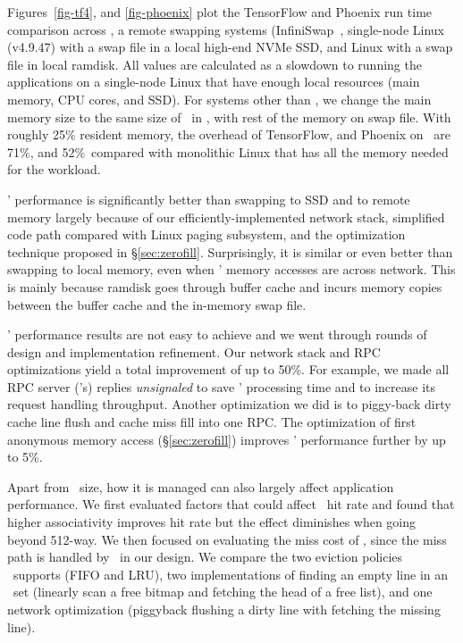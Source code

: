 \documentclass[10pt,times,twocolumn]{z2-article}
\begin{document}
{{{{{{{
Figures~\ref{fig-tf4}, and \ref{fig-phoenix} plot the TensorFlow and Phoenix run time comparison across 
\lego, a remote swapping systems (InfiniSwap~\cite{GU17-NSDI}, 
single-node Linux (v4.9.47) with a swap file in a local high-end NVMe SSD, and Linux with a swap file in local ramdisk.
All values are calculated as a slowdown to running the applications on a single-node Linux that have enough local resources (main memory, CPU cores, and SSD).
For systems other than \lego, we change the main memory size to the same size of \excache\ in \lego, with rest of the memory on swap file. 
With roughly 25\% resident memory, the overhead of TensorFlow, and Phoenix on \lego\ are 
71\%, and 52\%\ compared with monolithic Linux that has all the memory needed for the workload.

\lego' performance is significantly better than swapping to SSD and to remote memory 
largely because of our efficiently-implemented network stack, simplified code path compared with Linux paging subsystem,
and the optimization technique proposed in \S\ref{sec:zerofill}.
Surprisingly, it is similar or even better than swapping to local memory, even when \lego' memory accesses are across network.
This is mainly because ramdisk goes through buffer cache and incurs memory copies between the buffer cache and the in-memory swap file.

\lego' performance results are not easy to achieve and we went through rounds of design and implementation refinement.
Our network stack and RPC optimizations yield a total improvement of up to 50\%.
For example, we made all RPC server (\mcomponent's) replies {\em unsignaled} to save \mcomponent' processing time
and to increase its request handling throughput.
Another optimization we did is to piggy-back dirty cache line flush and cache miss fill into one RPC.
The optimization of first anonymous memory access (\S\ref{sec:zerofill}) improves \lego' performance further by up to 5\%.

Apart from \excache\ size, how it is managed can also largely affect application performance.
We first evaluated factors that could affect \excache\ hit rate and found that higher associativity improves hit rate
but the effect diminishes when going beyond 512-way.
We then focused on evaluating the miss cost of \excache, since the miss path is handled by \lego\ in our design.
We compare the two eviction policies \lego\ supports (FIFO and LRU),
two implementations of finding an empty line in an \excache\ set (linearly scan a free bitmap and fetching the head of a free list),
and one network optimization (piggyback flushing a dirty line with fetching the missing line).

}}}}}}}
\end{document}
